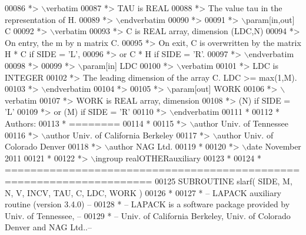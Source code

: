 \begin{DoxyCode}
00086 \textcolor{comment}{*> \(\backslash\)verbatim}
00087 \textcolor{comment}{*>          TAU is REAL}
00088 \textcolor{comment}{*>          The value tau in the representation of H.}
00089 \textcolor{comment}{*> \(\backslash\)endverbatim}
00090 \textcolor{comment}{*>}
00091 \textcolor{comment}{*> \(\backslash\)param[in,out] C}
00092 \textcolor{comment}{*> \(\backslash\)verbatim}
00093 \textcolor{comment}{*>          C is REAL array, dimension (LDC,N)}
00094 \textcolor{comment}{*>          On entry, the m by n matrix C.}
00095 \textcolor{comment}{*>          On exit, C is overwritten by the matrix H * C if SIDE = 'L',}
00096 \textcolor{comment}{*>          or C * H if SIDE = 'R'.}
00097 \textcolor{comment}{*> \(\backslash\)endverbatim}
00098 \textcolor{comment}{*>}
00099 \textcolor{comment}{*> \(\backslash\)param[in] LDC}
00100 \textcolor{comment}{*> \(\backslash\)verbatim}
00101 \textcolor{comment}{*>          LDC is INTEGER}
00102 \textcolor{comment}{*>          The leading dimension of the array C. LDC >= max(1,M).}
00103 \textcolor{comment}{*> \(\backslash\)endverbatim}
00104 \textcolor{comment}{*>}
00105 \textcolor{comment}{*> \(\backslash\)param[out] WORK}
00106 \textcolor{comment}{*> \(\backslash\)verbatim}
00107 \textcolor{comment}{*>          WORK is REAL array, dimension}
00108 \textcolor{comment}{*>                         (N) if SIDE = 'L'}
00109 \textcolor{comment}{*>                      or (M) if SIDE = 'R'}
00110 \textcolor{comment}{*> \(\backslash\)endverbatim}
00111 \textcolor{comment}{*}
00112 \textcolor{comment}{*  Authors:}
00113 \textcolor{comment}{*  ========}
00114 \textcolor{comment}{*}
00115 \textcolor{comment}{*> \(\backslash\)author Univ. of Tennessee }
00116 \textcolor{comment}{*> \(\backslash\)author Univ. of California Berkeley }
00117 \textcolor{comment}{*> \(\backslash\)author Univ. of Colorado Denver }
00118 \textcolor{comment}{*> \(\backslash\)author NAG Ltd. }
00119 \textcolor{comment}{*}
00120 \textcolor{comment}{*> \(\backslash\)date November 2011}
00121 \textcolor{comment}{*}
00122 \textcolor{comment}{*> \(\backslash\)ingroup realOTHERauxiliary}
00123 \textcolor{comment}{*}
00124 \textcolor{comment}{*  =====================================================================}
00125 \textcolor{keyword}{      SUBROUTINE }slarf( SIDE, M, N, V, INCV, TAU, C, LDC, WORK )
00126 \textcolor{comment}{*}
00127 \textcolor{comment}{*  -- LAPACK auxiliary routine (version 3.4.0) --}
00128 \textcolor{comment}{*  -- LAPACK is a software package provided by Univ. of Tennessee,    --}
00129 \textcolor{comment}{*  -- Univ. of California Berkeley, Univ. of Colorado Denver and NAG Ltd..--}

\end{DoxyCode}

